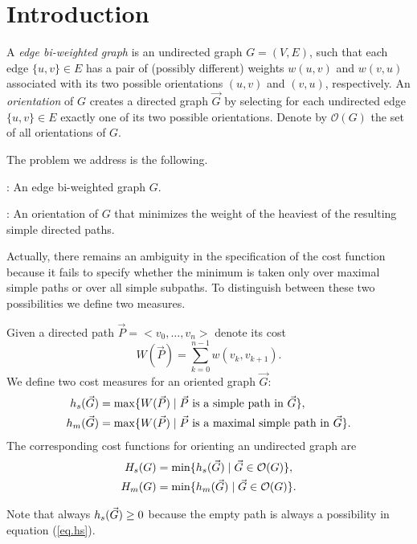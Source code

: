 \section{Introduction}

A \emph{edge bi-weighted graph} is an undirected graph $G = (V, E)$, such that each edge $\{u, v\} \in E$ has a pair of (possibly different) weights $w(u, v)$ and $w(v, u)$ associated with its two possible orientations $(u, v)$ and $(v, u)$, respectively. An \emph{orientation} 
of $G$ creates a directed graph $\vec{G}
$ 
by selecting for each undirected edge $\{u, v\} \in E$ exactly one of its two possible orientations. Denote by $\mathcal{O}(G)$ the set of all orientations of $G$. 

The problem we address is the following.

: An edge bi-weighted graph $G$.

: An orientation  of $G$ that minimizes the weight of 
the heaviest of the resulting simple directed paths.

Actually, there remains an ambiguity in the specification of the cost function because it 
fails to specify whether the minimum is taken only over maximal 
simple paths or over all simple subpaths. To distinguish between these two possibilities we define two measures.

\begin{definition}
	Given a directed path $\vec{P}=<v_0,\ldots,v_n>$ denote its cost
	\begin{equation}\label{eq.W}
		W(\vec{P})=\sum_{k=0}^{n-1} w(v_k,v_{k+1}).
	\end{equation}
	We define two cost measures for an oriented graph $\vec{G}$:
	\begin{align} 
		h_s(\vec{G}) &= \max\{W(\vec{P})\mid \vec{P} \mbox{ is a simple path in }\vec{G} \},\label{eq.hs} \\
		h_m(\vec{G}) &= \max\{W(\vec{P})\mid \vec{P} \mbox{ is a maximal simple path in }\vec{G} \}.\label{eq.hm}
	\end{align}
	The corresponding cost functions for orienting an undirected graph are 
	\begin{align}
		H_s(G) &= \min\{h_s(\vec{G})\mid \vec{G} \in \mathcal{O}(G)\}, \\
		H_m(G) &= \min\{h_m(\vec{G})\mid \vec{G} \in \mathcal{O}(G)\}.
	\end{align}
\end{definition}
Note that always $h_s(\vec{G})\geq 0$ because the empty path is always a possibility in equation (\ref{eq.hs}).

